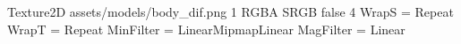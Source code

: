 Texture2D
assets/models/body_dif.png
1
RGBA
SRGB
false
4
WrapS = Repeat
WrapT = Repeat
MinFilter = LinearMipmapLinear
MagFilter = Linear
